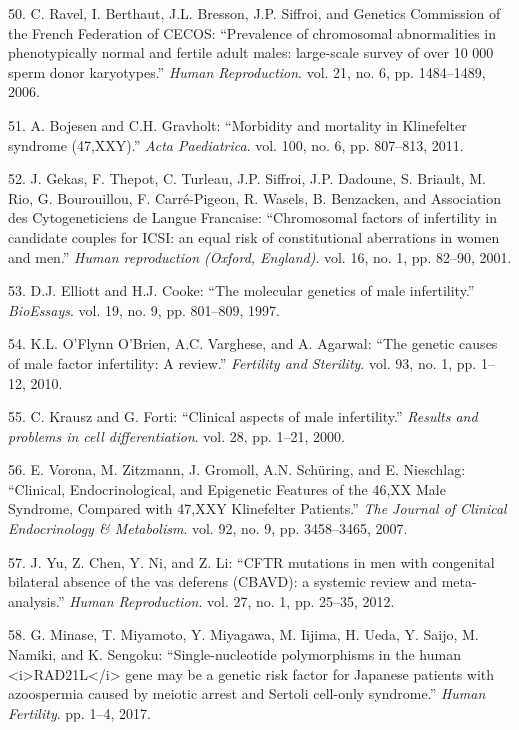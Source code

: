 \documentclass[12pt,twoside]{reedthesis}
\theoremstyle{definition}
\theoremstyle{definition}
\theoremstyle{remark}
\begin{document}
  \hypertarget{ref-Ravel2006}{}
  50. C. Ravel, I. Berthaut, J.L. Bresson, J.P. Siffroi, and Genetics
  Commission of the French Federation of CECOS: ``Prevalence of
  chromosomal abnormalities in phenotypically normal and fertile adult
  males: large-scale survey of over 10 000 sperm donor karyotypes.''
  \emph{Human Reproduction}. vol. 21, no. 6, pp. 1484--1489, 2006.
  
  \hypertarget{ref-Bojesen2011}{}
  51. A. Bojesen and C.H. Gravholt: ``Morbidity and mortality in
  Klinefelter syndrome (47,XXY).'' \emph{Acta Paediatrica}. vol. 100, no.
  6, pp. 807--813, 2011.
  
  \hypertarget{ref-Gekas2001}{}
  52. J. Gekas, F. Thepot, C. Turleau, J.P. Siffroi, J.P. Dadoune, S.
  Briault, M. Rio, G. Bourouillou, F. Carré-Pigeon, R. Wasels, B.
  Benzacken, and Association des Cytogeneticiens de Langue Francaise:
  ``Chromosomal factors of infertility in candidate couples for ICSI: an
  equal risk of constitutional aberrations in women and men.'' \emph{Human
  reproduction (Oxford, England)}. vol. 16, no. 1, pp. 82--90, 2001.
  
  \hypertarget{ref-Elliott1997}{}
  53. D.J. Elliott and H.J. Cooke: ``The molecular genetics of male
  infertility.'' \emph{BioEssays}. vol. 19, no. 9, pp. 801--809, 1997.
  
  \hypertarget{ref-OFlynnOBrien2010}{}
  54. K.L. O'Flynn O'Brien, A.C. Varghese, and A. Agarwal: ``The genetic
  causes of male factor infertility: A review.'' \emph{Fertility and
  Sterility}. vol. 93, no. 1, pp. 1--12, 2010.
  
  \hypertarget{ref-Krausz2000}{}
  55. C. Krausz and G. Forti: ``Clinical aspects of male infertility.''
  \emph{Results and problems in cell differentiation}. vol. 28, pp. 1--21,
  2000.
  
  \hypertarget{ref-Vorona2007}{}
  56. E. Vorona, M. Zitzmann, J. Gromoll, A.N. Schüring, and E. Nieschlag:
  ``Clinical, Endocrinological, and Epigenetic Features of the 46,XX Male
  Syndrome, Compared with 47,XXY Klinefelter Patients.'' \emph{The Journal
  of Clinical Endocrinology \& Metabolism}. vol. 92, no. 9, pp.
  3458--3465, 2007.
  
  \hypertarget{ref-Yu2012}{}
  57. J. Yu, Z. Chen, Y. Ni, and Z. Li: ``CFTR mutations in men with
  congenital bilateral absence of the vas deferens (CBAVD): a systemic
  review and meta-analysis.'' \emph{Human Reproduction}. vol. 27, no. 1,
  pp. 25--35, 2012.
  
  \hypertarget{ref-Minase2017}{}
  58. G. Minase, T. Miyamoto, Y. Miyagawa, M. Iijima, H. Ueda, Y. Saijo,
  M. Namiki, and K. Sengoku: ``Single-nucleotide polymorphisms in the
  human \textless{}i\textgreater{}RAD21L\textless{}/i\textgreater{} gene
  may be a genetic risk factor for Japanese patients with azoospermia
  caused by meiotic arrest and Sertoli cell-only syndrome.'' \emph{Human
  Fertility}. pp. 1--4, 2017.
  
\end{document}
